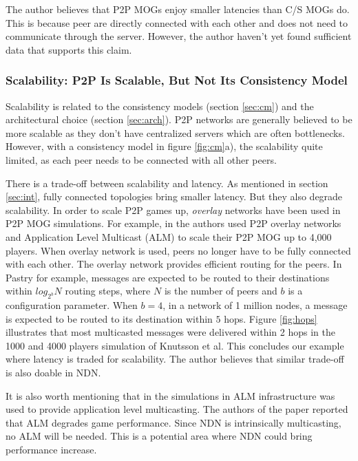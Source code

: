 \documentclass{article}
\begin{document}
The author believes that P2P MOGs enjoy smaller latencies than C/S MOGs do. This is because peer are directly connected with each other and does not need to communicate through the server. However, the author haven't yet found sufficient data that supports this claim. 

\subsubsection{Scalability: P2P Is Scalable, But Not Its Consistency Model}
Scalability is related to the consistency models (section \ref{sec:cm}) and the architectural choice (section \ref{sec:arch}). P2P networks are generally believed to be more scalable as they don't have centralized servers which are often bottlenecks. However, with a consistency model in figure \ref{fig:cm}a), the scalability quite limited, as each peer needs to be connected with all other peers. 

There is a trade-off between scalability and latency. As mentioned in section \ref{sec:int}, fully connected topologies bring smaller latency. But they also degrade scalability. In order to scale P2P games up, \emph{overlay} networks have been used in P2P MOG simulations. For example, in \cite{Knutsson04} the authors used P2P overlay networks and Application Level Multicast (ALM) to scale their P2P MOG up to 4,000 players. When overlay network is used, peers no longer have to be fully connected with each other. The overlay network provides efficient routing for the peers. In Pastry \cite{Lua04} for example, messages are expected to be routed to their destinations within $log_{2^b}N$ routing steps, where $N$ is the number of peers and $b$ is a configuration parameter. When $b = 4$, in a network of 1 million nodes, a message is expected to be routed to its destination within $5$ hops. Figure \ref{fig:hops} illustrates that most multicasted messages were delivered within 2 hops in the 1000 and 4000 players simulation of Knutsson et al. This concludes our example where latency is traded for scalability. The author believes that similar trade-off is also doable in NDN.

It is also worth mentioning that in the simulations in \cite{Knutsson04} ALM infrastructure was used to provide application level multicasting. The authors of the paper reported that ALM degrades game performance. Since NDN is intrinsically multicasting, no ALM will be needed. This is a potential area where NDN could bring performance increase.
\end{document}
